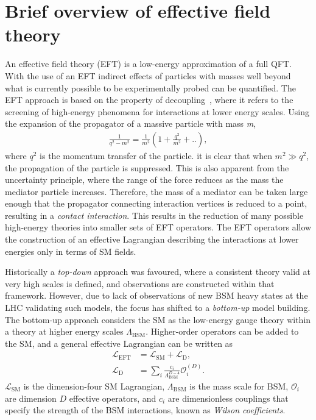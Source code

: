 \section{Brief overview of effective field theory}\label{sec:bsm:eft}
An effective field theory (EFT) is a low-energy approximation of a full QFT. With the use of an EFT indirect effects of particles with masses well beyond what is currently possible to be experimentally probed can be quantified. The EFT approach is based on the property of decoupling~\cite{manohar2018introduction}, where it refers to the screening of high-energy phenomena for interactions at lower energy scales. Using the expansion of the propagator of a massive particle with mass \emph{m}, 
\begin{equation}
    \label{eq:propogator}
    \begin{aligned}
        \frac{1}{q^2 - m^2} = \frac{1}{m^2}(1 + \frac{q^2}{m^2} + ..),
     \end{aligned}
\end{equation}
where $q^2$ is the momentum transfer of the particle. it is clear that when $m^2 \gg q^2$, the propagation of the particle is suppressed. This is also apparent from the uncertainty principle, where the range of the force reduces as the mass the mediator particle increases. Therefore, the mass of a mediator can be taken large enough that the propagator connecting interaction vertices is reduced to a point, resulting in a \emph{contact interaction}. This results in the reduction of many possible high-energy theories into smaller sets of EFT operators. The EFT operators allow the construction of an effective Lagrangian describing the interactions at lower energies only in terms of SM fields. 

Historically a \emph{top-down} approach was favoured, where a consistent theory valid at very high scales is defined, and observations are constructed within that framework. However, due to lack of observations of new BSM heavy states at the LHC validating such models, the focus has shifted to a \emph{bottom-up} model building. The bottom-up approach considers the SM as the low-energy gauge theory within a theory at higher energy scales $\Lambda_{\mathrm{BSM}}$. Higher-order operators can be added to the SM, and a general effective Lagrangian can be written as
\begin{equation}
    \label{eq:eftLagrangian}
    \begin{aligned}
        \mathcal{L}_\mathrm{EFT} &=  \mathcal{L}_\mathrm{SM} +  \mathcal{L}_\mathrm{D},\\
        \mathcal{L}_\mathrm{D}   &= \sum_i \frac{c_i}{\Lambda_{\mathrm{BSM}}^{D-4}}\mathcal{O}^{(D)}_i.
     \end{aligned}
\end{equation}
$\mathcal{L}_\mathrm{SM}$ is the dimension-four SM Lagrangian, $\Lambda_{\mathrm{BSM}}$ is the mass scale for BSM, $\mathcal{O}_i$ are dimension $D$ effective operators, and $c_i$ are dimensionless couplings that specify the strength of the BSM interactions, known as \emph{Wilson coefficients}. 

